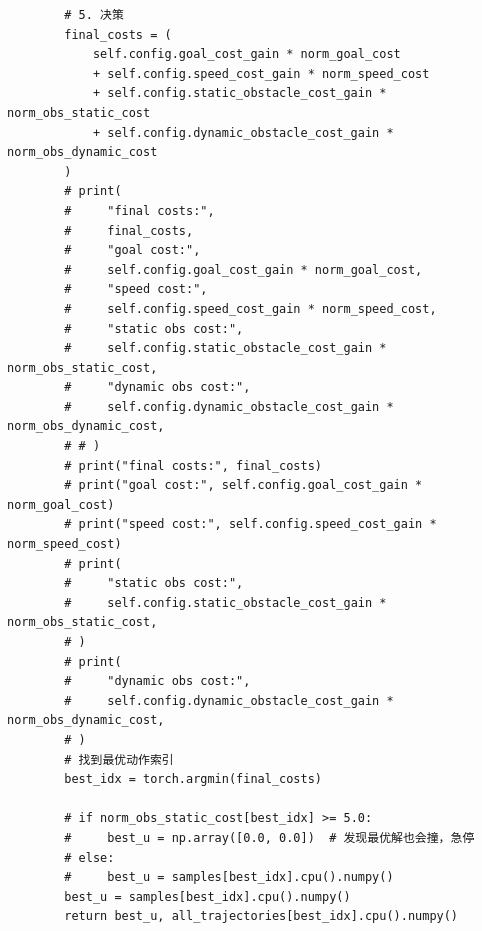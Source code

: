 \begin{verbatim}
        # 5. 决策
        final_costs = (
            self.config.goal_cost_gain * norm_goal_cost
            + self.config.speed_cost_gain * norm_speed_cost
            + self.config.static_obstacle_cost_gain * norm_obs_static_cost
            + self.config.dynamic_obstacle_cost_gain * norm_obs_dynamic_cost
        )
        # print(
        #     "final costs:",
        #     final_costs,
        #     "goal cost:",
        #     self.config.goal_cost_gain * norm_goal_cost,
        #     "speed cost:",
        #     self.config.speed_cost_gain * norm_speed_cost,
        #     "static obs cost:",
        #     self.config.static_obstacle_cost_gain * norm_obs_static_cost,
        #     "dynamic obs cost:",
        #     self.config.dynamic_obstacle_cost_gain * norm_obs_dynamic_cost,
        # # )
        # print("final costs:", final_costs)
        # print("goal cost:", self.config.goal_cost_gain * norm_goal_cost)
        # print("speed cost:", self.config.speed_cost_gain * norm_speed_cost)
        # print(
        #     "static obs cost:",
        #     self.config.static_obstacle_cost_gain * norm_obs_static_cost,
        # )
        # print(
        #     "dynamic obs cost:",
        #     self.config.dynamic_obstacle_cost_gain * norm_obs_dynamic_cost,
        # )
        # 找到最优动作索引
        best_idx = torch.argmin(final_costs)

        # if norm_obs_static_cost[best_idx] >= 5.0:
        #     best_u = np.array([0.0, 0.0])  # 发现最优解也会撞，急停
        # else:
        #     best_u = samples[best_idx].cpu().numpy()
        best_u = samples[best_idx].cpu().numpy()
        return best_u, all_trajectories[best_idx].cpu().numpy()
\end{verbatim}

